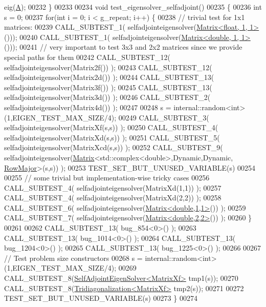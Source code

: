 \begin{DoxyCode}
      eig(\hyperlink{group___core___module_class_eigen_1_1_matrix}{A});
00232 \}
00233 
00234 \textcolor{keywordtype}{void} test\_eigensolver\_selfadjoint()
00235 \{
00236   \textcolor{keywordtype}{int} s = 0;
00237   \textcolor{keywordflow}{for}(\textcolor{keywordtype}{int} i = 0; i < g\_repeat; i++) \{
00238     \textcolor{comment}{// trivial test for 1x1 matrices:}
00239     CALL\_SUBTEST\_1( selfadjointeigensolver(\hyperlink{group___core___module_class_eigen_1_1_matrix}{Matrix<float, 1, 1>}()));
00240     CALL\_SUBTEST\_1( selfadjointeigensolver(\hyperlink{group___core___module_class_eigen_1_1_matrix}{Matrix<double, 1, 1>}()));
00241     \textcolor{comment}{// very important to test 3x3 and 2x2 matrices since we provide special paths for them}
00242     CALL\_SUBTEST\_12( selfadjointeigensolver(Matrix2f()) );
00243     CALL\_SUBTEST\_12( selfadjointeigensolver(Matrix2d()) );
00244     CALL\_SUBTEST\_13( selfadjointeigensolver(Matrix3f()) );
00245     CALL\_SUBTEST\_13( selfadjointeigensolver(Matrix3d()) );
00246     CALL\_SUBTEST\_2( selfadjointeigensolver(Matrix4d()) );
00247     
00248     s = internal::random<int>(1,EIGEN\_TEST\_MAX\_SIZE/4);
00249     CALL\_SUBTEST\_3( selfadjointeigensolver(MatrixXf(s,s)) );
00250     CALL\_SUBTEST\_4( selfadjointeigensolver(MatrixXd(s,s)) );
00251     CALL\_SUBTEST\_5( selfadjointeigensolver(MatrixXcd(s,s)) );
00252     CALL\_SUBTEST\_9( selfadjointeigensolver(\hyperlink{group___core___module_class_eigen_1_1_matrix}{Matrix}<std::complex<double>,Dynamic,Dynamic,
      \hyperlink{group__enums_ggaacded1a18ae58b0f554751f6cdf9eb13acfcde9cd8677c5f7caf6bd603666aae3}{RowMajor}>(s,s)) );
00253     TEST\_SET\_BUT\_UNUSED\_VARIABLE(s)
00254 
00255     \textcolor{comment}{// some trivial but implementation-wise tricky cases}
00256     CALL\_SUBTEST\_4( selfadjointeigensolver(MatrixXd(1,1)) );
00257     CALL\_SUBTEST\_4( selfadjointeigensolver(MatrixXd(2,2)) );
00258     CALL\_SUBTEST\_6( selfadjointeigensolver(\hyperlink{group___core___module_class_eigen_1_1_matrix}{Matrix<double,1,1>}()) );
00259     CALL\_SUBTEST\_7( selfadjointeigensolver(\hyperlink{group___core___module_class_eigen_1_1_matrix}{Matrix<double,2,2>}()) );
00260   \}
00261   
00262   CALL\_SUBTEST\_13( bug\_854<0>() );
00263   CALL\_SUBTEST\_13( bug\_1014<0>() );
00264   CALL\_SUBTEST\_13( bug\_1204<0>() );
00265   CALL\_SUBTEST\_13( bug\_1225<0>() );
00266 
00267   \textcolor{comment}{// Test problem size constructors}
00268   s = internal::random<int>(1,EIGEN\_TEST\_MAX\_SIZE/4);
00269   CALL\_SUBTEST\_8(\hyperlink{group___eigenvalues___module_class_eigen_1_1_self_adjoint_eigen_solver}{SelfAdjointEigenSolver<MatrixXf>} tmp1(s));
00270   CALL\_SUBTEST\_8(\hyperlink{group___eigenvalues___module_class_eigen_1_1_tridiagonalization}{Tridiagonalization<MatrixXf>} tmp2(s));
00271   
00272   TEST\_SET\_BUT\_UNUSED\_VARIABLE(s)
00273 \}
00274 
\end{DoxyCode}
